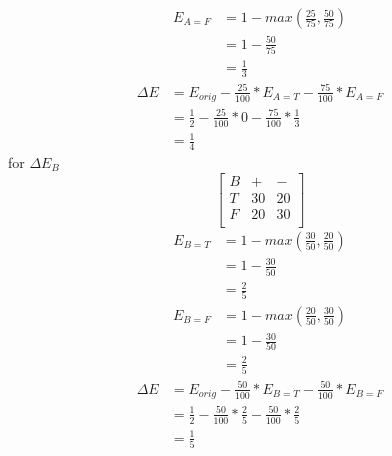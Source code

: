 \documentclass[12pt,english]{article}
\begin{document}
\begin{equation*}\tag{4}\label{eq:31}
\begin{split}
E_{A=F} &= 1 - max(\frac{25}{75},\frac{50}{75})\\
&=1 - \frac{50}{75}\\
&=\frac{1}{3}
\end{split}
\end{equation*}
\begin{equation*}\tag{5}\label{eq:32}
\begin{split}
\Delta E &= E_{orig} - \frac{25}{100} * E_{A=T} - \frac{75}{100} * E_{A=F}\\
&= \frac{1}{2} -\frac{25}{100} *0 - \frac{75}{100} *\frac{1}{3}\\
&= \frac{1}{4}
\end{split}
\end{equation*}
for $\Delta E_{B}$\\
\begin{equation*}\tag{6}\label{eq:33}
\begin{bmatrix} B & + & - \\T & 30 &  20 \\F & 20 & 30 \\ \end{bmatrix}
\end{equation*}
\begin{equation*}\tag{7}\label{eq:34}
\begin{split}
E_{B=T} &= 1 - max(\frac{30}{50},\frac{20}{50})\\
&=1 - \frac{30}{50}\\
&=\frac{2}{5}
\end{split}
\end{equation*}
\begin{equation*}\tag{8}\label{eq:35}
\begin{split}
E_{B=F} &= 1 - max(\frac{20}{50},\frac{30}{50})\\
&=1 - \frac{30}{50}\\
&=\frac{2}{5}
\end{split}
\end{equation*}
\begin{equation*}\tag{9}\label{eq:36}
\begin{split}
\Delta E &= E_{orig} - \frac{50}{100} * E_{B=T} - \frac{50}{100} * E_{B=F}\\
&= \frac{1}{2} -\frac{50}{100} *\frac{2}{5} - \frac{50}{100} *\frac{2}{5}\\
&= \frac{1}{5}
\end{split}
\end{equation*}
\end{document}

